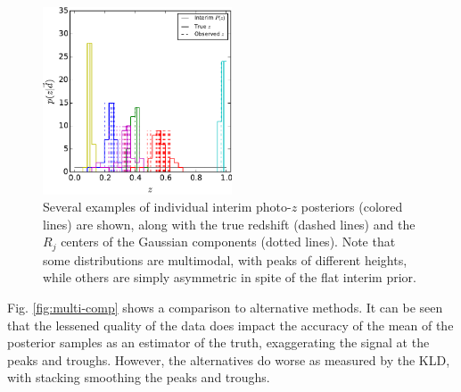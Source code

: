 \documentclass[preprint]{aastex}
\begin{document}
\begin{figure}
\includegraphics[width=0.5\textwidth]{figs/mult/samplepzs.pdf}
\caption{Several examples of individual interim photo-$z$ posteriors (colored 
lines) are shown, along with the true redshift (dashed lines) and the $R_{j}$ 
centers of the Gaussian components (dotted lines).  Note that some 
distributions are multimodal, with peaks of different heights, while others are 
simply asymmetric in spite of the flat interim prior.}
\label{fig:multipzs}
\end{figure}

Fig. \ref{fig:multi-comp} shows a comparison to alternative methods.  It can be 
seen that the lessened quality of the data does impact the accuracy of the mean 
of the posterior samples as an estimator of the truth, exaggerating the signal 
at the peaks and troughs.  However, the alternatives do worse as measured by 
the KLD, with stacking smoothing the peaks and troughs.

\end{document}
